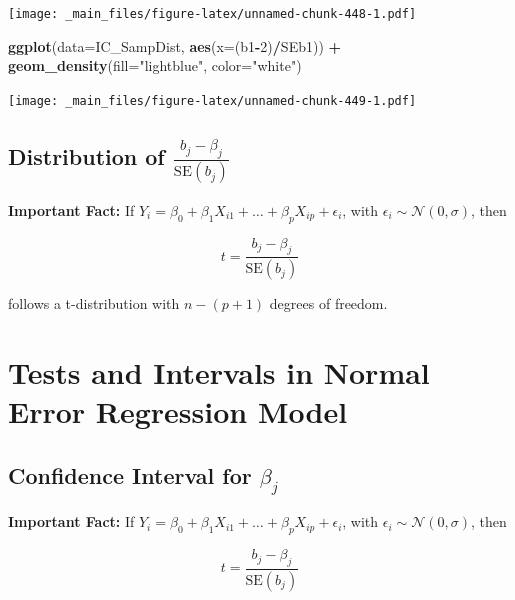 \documentclass[]{book}
\newenvironment{Shaded}{\begin{snugshade}}{\end{snugshade}}
\newcommand{\KeywordTok}[1]{\textcolor[rgb]{0.13,0.29,0.53}{\textbf{#1}}}
\newcommand{\DataTypeTok}[1]{\textcolor[rgb]{0.13,0.29,0.53}{#1}}
\newcommand{\DecValTok}[1]{\textcolor[rgb]{0.00,0.00,0.81}{#1}}
\newcommand{\StringTok}[1]{\textcolor[rgb]{0.31,0.60,0.02}{#1}}
\newcommand{\OperatorTok}[1]{\textcolor[rgb]{0.81,0.36,0.00}{\textbf{#1}}}
\newcommand{\NormalTok}[1]{#1}
\begin{document}
\texttt{[image: \_main\_files/figure-latex/unnamed-chunk-448-1.pdf]}

\begin{Shaded}
\begin{Highlighting}[]
\KeywordTok{ggplot}\NormalTok{(}\DataTypeTok{data=}\NormalTok{IC_SampDist, }\KeywordTok{aes}\NormalTok{(}\DataTypeTok{x=}\NormalTok{(b1}\OperatorTok{-}\DecValTok{2}\NormalTok{)}\OperatorTok{/}\NormalTok{SEb1)) }\OperatorTok{+}\StringTok{ }
\StringTok{  }\KeywordTok{geom_density}\NormalTok{(}\DataTypeTok{fill=}\StringTok{"lightblue"}\NormalTok{, }\DataTypeTok{color=}\StringTok{"white"}\NormalTok{)}
\end{Highlighting}
\end{Shaded}

\texttt{[image: \_main\_files/figure-latex/unnamed-chunk-449-1.pdf]}

\subsection{\texorpdfstring{Distribution of
\(\frac{{b_j}-\beta_j}{\text{SE}(b_j)}\)}{Distribution of \textbackslash{}frac\{\{b\_j\}-\textbackslash{}beta\_j\}\{\textbackslash{}text\{SE\}(b\_j)\}}}\label{distribution-of-fracb_j-beta_jtextseb_j}

\textbf{Important Fact:} If
\(Y_i = \beta_0 + \beta_1X_{i1}+ \ldots + \beta_pX_{ip} + \epsilon_i\),
with \(\epsilon_i\sim\mathcal{N}(0,\sigma)\), then

\[
t= \frac{{b_j}-\beta_j}{\text{SE}(b_j)}  
\]

follows a t-distribution with \(n-(p+1)\) degrees of freedom.

\section{Tests and Intervals in Normal Error Regression
Model}\label{tests-and-intervals-in-normal-error-regression-model}

\subsection{\texorpdfstring{Confidence Interval for
\(\beta_j\)}{Confidence Interval for \textbackslash{}beta\_j}}\label{confidence-interval-for-beta_j}

\textbf{Important Fact:} If
\(Y_i = \beta_0 + \beta_1X_{i1}+ \ldots + \beta_pX_{ip} + \epsilon_i\),
with \(\epsilon_i\sim\mathcal{N}(0,\sigma)\), then

\[
t= \frac{{b_j}-\beta_j}{\text{SE}(b_j)}  
\]
\end{document}
